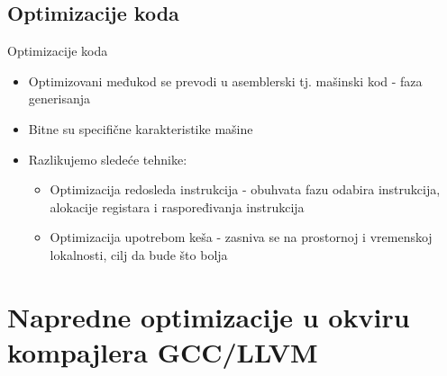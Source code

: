 \documentclass[compress, containsverbatim,mathserif, xcolor=dvipsnames, unicode]{beamer}
\begin{document}
\subsection{Optimizacije koda}
\begin{frame}{Optimizacije koda}
    
    \begin{itemize}
        \item Optimizovani međukod se prevodi u asemblerski tj. mašinski kod - faza generisanja
        \item  Bitne su specifične karakteristike mašine
        \item Razlikujemo  sledeće tehnike: 
                \begin{itemize}
                    \item Optimizacija redosleda instrukcija - obuhvata fazu odabira instrukcija, alokacije registara i raspoređivanja instrukcija
                    \item Optimizacija upotrebom keša - zasniva se na prostornoj i vremenskoj lokalnosti, cilj da bude što bolja
                \end{itemize}
        \end{itemize}
\end{frame}

\section{Napredne optimizacije u okviru kompajlera GCC/LLVM}
\end{document}
